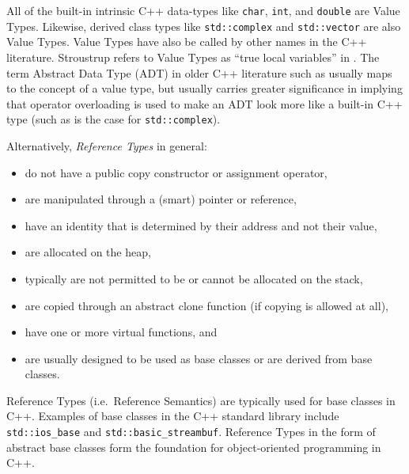 \documentclass[pdf,ps2pdf,11pt]{SANDreport}
\begin{document}
All of the built-in intrinsic C++ data-types like {}\texttt{char},
{}\texttt{int}, and {}\texttt{double} are Value Types.  Likewise,
derived class types like {}\texttt{std::complex} and
{}\texttt{std::vector} are also Value Types.  Value Types have also be
called by other names in the C++ literature.  Stroustrup refers to
Value Types as ``true local variables'' in {}\cite{stroustrup94}.  The
term Abstract Data Type (ADT) in older C++ literature such as
{}\cite{AdvancedC++92} usually maps to the concept of a value type,
but usually carries greater significance in implying that operator
overloading is used to make an ADT look more like a built-in C++ type
(such as is the case for {}\texttt{std::complex}).

Alternatively, {}\textit{Reference Types} in general:

\begin{itemize}

{}\item do not have a public copy constructor or assignment operator,

{}\item are manipulated through a (smart) pointer or reference,

{}\item have an identity that is determined by their address and not
their value,

{}\item are allocated on the heap,

{}\item typically are not permitted to be or cannot be allocated on
the stack,

{}\item are copied through an abstract clone function (if copying is
allowed at all),

{}\item have one or more virtual functions, and

{}\item are usually designed to be used as base classes or are derived
from base classes.

\end{itemize}

Reference Types (i.e.\ Reference Semantics) are typically used for base
classes in C++.  Examples of base classes in the C++ standard library
include {}\texttt{std::ios\_base} and
{}\texttt{std::basic\_streambuf}.  Reference Types in the form of
abstract base classes form the foundation for object-oriented
programming in C++.
\end{document}
